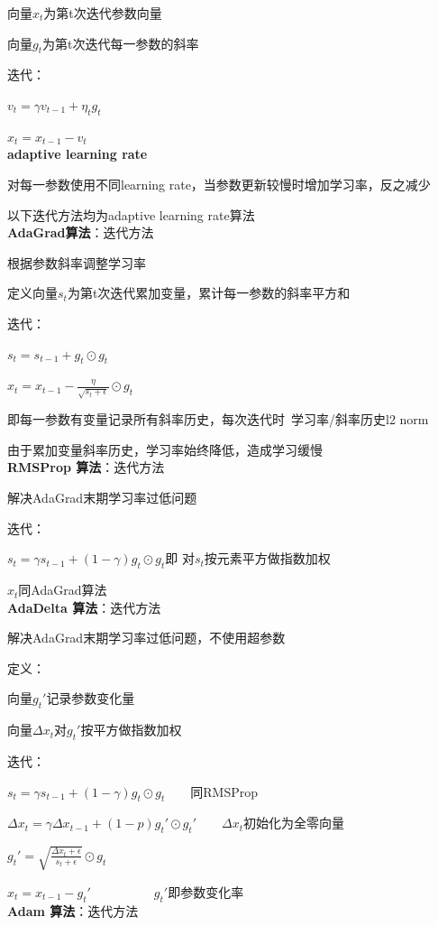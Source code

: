 \documentclass[UTF8]{ctexart}
\begin{document}
  \quad 向量$x_t$为第t次迭代参数向量

  \quad 向量$g_t$为第t次迭代每一参数的斜率

  迭代：

  \quad $v_t = \gamma v_{t-1} + \eta_t g_t$

  \quad $x_t = x_{t-1} - v_t$\\
\textbf{adaptive learning rate}

  对每一参数使用不同learning rate，当参数更新较慢时增加学习率，反之减少
  
  以下迭代方法均为adaptive learning rate算法\\
\textbf{AdaGrad算法}：迭代方法

  根据参数斜率调整学习率

  定义向量$s_t$为第t次迭代累加变量，累计每一参数的斜率平方和

  迭代：

  \quad $s_t = s_{t-1} + g_t \odot g_t$

  \quad $x_t = x_{t-1} - \frac{\eta}{\sqrt{s_t + \epsilon } } \odot g_t$

  \quad \quad 即每一参数有变量记录所有斜率历史，每次迭代时\ 学习率/斜率历史l2 norm

  由于累加变量斜率历史，学习率始终降低，造成学习缓慢\\
\textbf{RMSProp 算法}：迭代方法

  解决AdaGrad末期学习率过低问题

  迭代：
  
  \quad $s_t = \gamma s_{t-1} + (1-\gamma)g_t \odot g_t$即 对$s_t$按元素平方做指数加权

  \quad $x_t$同AdaGrad算法\\
\textbf{AdaDelta 算法}：迭代方法

  解决AdaGrad末期学习率过低问题，不使用超参数

  定义：

  \quad 向量$g_t'$记录参数变化量

  \quad 向量$\varDelta x_t$对$g_t'$按平方做指数加权

  迭代：

  \quad $s_t = \gamma s_{t-1} + (1-\gamma)g_t \odot g_t$\ \ \ \ 同RMSProp

  \quad $\varDelta x_t = \gamma \varDelta x_{t-1} + (1-p)g_t' \odot g_t'$\ \ \ \ $\varDelta x_t$初始化为全零向量

  \quad $g_t' = \sqrt{\frac{\varDelta x_t + \epsilon }{s_t + \epsilon }} \odot g_t $

  \quad $x_t = x_{t-1} - g_t'$\ \ \ \ \ \ \ \ \ \ $g_t'$即参数变化率\\
\textbf{Adam 算法}：迭代方法
\end{document}
